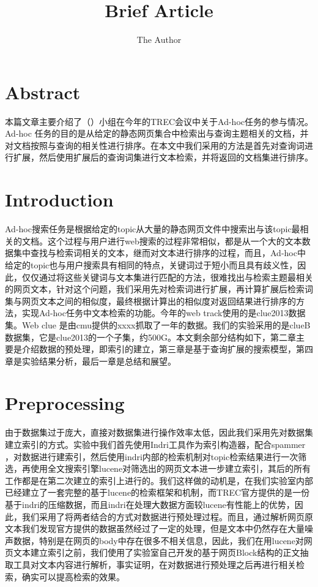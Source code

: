 \documentclass[11pt]{article} %
\title{Brief Article}
\author{The Author}
\begin{document}
\begin{CJK}{UTF8}{gkai}
\maketitle

\section{Abstract}
本篇文章主要介绍了（）小组在今年的TREC会议中关于Ad-hoc任务的参与情况。Ad-hoc  任务的目的是从给定的静态网页集合中检索出与查询主题相关的文档，并对文档按照与查询的相关性进行排序。在本文中我们采用的方法是首先对查询词进行扩展，然后使用扩展后的查询词集进行文本检索，并将返回的文档集进行排序。

\section{Introduction}

Ad-hoc搜索任务是根据给定的topic从大量的静态网页文件中搜索出与该topic最相关的文档。这个过程与用户进行web搜索的过程非常相似，都是从一个大的文本数据集中查找与检索词相关的文本，继而对文本进行排序的过程，而且，Ad-hoc中给定的topic也与用户搜索具有相同的特点，关键词过于短小而且具有歧义性，因此，仅仅通过将这些关键词与文本集进行匹配的方法，很难找出与检索主题最相关的网页文本，针对这个问题，我们采用先对检索词进行扩展，再计算扩展后检索词集与网页文本之间的相似度，最终根据计算出的相似度对返回结果进行排序的方法，实现Ad-hoc任务中文本检索的功能。今年的web track使用的是clue2013数据集。Web clue 是由cmu提供的xxxx抓取了一年的数据。我们的实验采用的是clueB数据集，它是clue2013的一个子集，约500G。本文剩余部分结构如下，第二章主要是介绍数据的预处理，即索引的建立，第三章是基于查询扩展的搜索模型，第四章是实验结果分析，最后一章是总结和展望。

\section{Preprocessing}
由于数据集过于庞大，直接对数据集进行操作效率太低，因此我们采用先对数据集建立索引的方式。实验中我们首先使用Indri工具作为索引构造器，配合spammer \cite{Kxxspammer}，对数据进行建索引，然后使用indri内部的检索机制对topic检索结果进行一次筛选，再使用全文搜索引擎lucene对筛选出的网页文本进一步建立索引，其后的所有工作都是在第二次建立的索引上进行的。我们这样做的动机是，在我们实验室内部已经建立了一套完整的基于lucene的检索框架和机制，而TREC官方提供的是一份基于indri的压缩数据，而且indri在处理大数据方面较lucene有性能上的优势，因此，我们采用了将两者结合的方式对数据进行预处理过程。而且，通过解析网页原文本我们发现官方提供的数据虽然经过了一定的处理，但是文本中仍然存在大量噪声数据，特别是在网页的body中存在很多不相关信息，因此，我们在用lucene对网页文本建立索引之前，我们使用了实验室自己开发的基于网页Block结构的正文抽取工具对文本内容进行解析，事实证明，在对数据进行预处理之后再进行相关检索，确实可以提高检索的效果。


\end{CJK}
\end{document}
